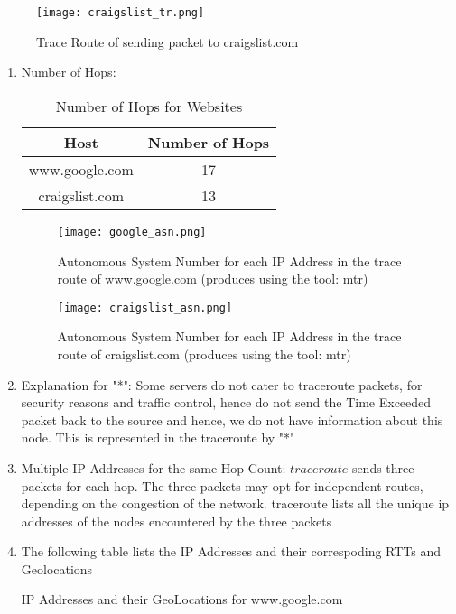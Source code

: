 \documentclass[12pt]{article}
\begin{document}
\begin{figure}[h!]
    \centering
    \texttt{[image: craigslist\_tr.png]}
    \caption{Trace Route of sending packet to craigslist.com}
\end{figure}
\renewcommand{\labelenumi}{\Alph{enumi}}
\begin{enumerate}
    \item Number of Hops:
    \begin{table}[h!]
        \centering
        \caption{Number of Hops for Websites}
        \begin{tabular}{|c|c|}
            \hline
            Host & Number of Hops \\
            \hline
            www.google.com & 17 \\
            craigslist.com & 13 \\
            \hline
        \end{tabular}
    \end{table}
    \begin{figure}[h!]
        \centering
        \texttt{[image: google\_asn.png]}
        \caption{Autonomous System Number for each IP Address in the trace route of www.google.com (produces using the tool: mtr)}
    \end{figure}
    \begin{figure}[h!]
        \centering
        \texttt{[image: craigslist\_asn.png]}
        \caption{Autonomous System Number for each IP Address in the trace route of craigslist.com (produces using the tool: mtr)}
    \end{figure}
    \item Explanation for "*": Some servers do not cater to traceroute packets, for security reasons and traffic control, hence do not send the Time Exceeded packet back to the source and hence, we do not have information about this node. This is represented in the traceroute by "*"
    \item Multiple IP Addresses for the same Hop Count: $traceroute$ sends three packets for each hop. The three packets may opt for independent routes, depending on the congestion of the network. traceroute lists all the unique ip addresses of the nodes encountered by the three packets
    \item The following table lists the IP Addresses and their correspoding RTTs and Geolocations
    \begin{table}[h!]
        \centering
        \caption{IP Addresses and their GeoLocations for www.google.com}

\end{table}
\end{enumerate}
\end{document}
